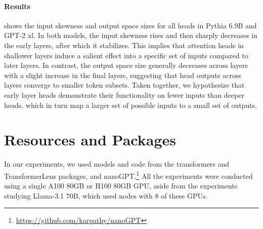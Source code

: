 \documentclass[11pt]{article}
\newcommand{\llamaThreeSeventyB}{Llama-3.1 70B}
\newcommand{\PythiaSevenB}{Pythia 6.9B}
\newcommand{\GPTxl}{GPT-2 xl}
\begin{document}
\paragraph{Results}  shows the input skewness and output space sizes for all heads in \PythiaSevenB{} and \GPTxl{}. 
In both models, the input skewness rises and then sharply decreases in the early layers, after which it stabilizes. This implies that attention heads in shallower layers induce a salient effect into a specific set of inputs compared to later layers. In contrast, the output space size generally decreases across layers with a slight increase in the final layers, suggesting that head outputs across layers converge to smaller token subsets.
Taken together, we hypothesize that early layer heads demonstrate their functionality on fewer inputs than deeper heads, which in turn map a larger set of possible inputs to a small set of outputs. 





\section{Resources and Packages}
\label{sec:resources}

In our experiments, we used models and code from the transformers \cite{wolf2019transformers} and TransformerLens \cite{nanda2022transformerlens} packages, and nanoGPT.\footnote{\url{https://github.com/karpathy/nanoGPT}}
All the experiments were conducted using a single A100 80GB or H100 80GB GPU, aside from the experiments studying \llamaThreeSeventyB{}, which used nodes with 8 of these GPUs.
\end{document}
